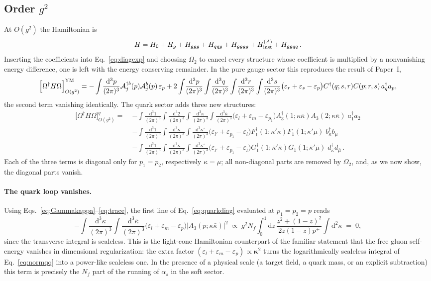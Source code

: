 \documentclass[11pt]{article}
\newcommand{\eps}{\varepsilon}
\newcommand{\dd}{\mathrm{d}}
\newcommand{\ip}[1]{\int\!\frac{\dd^3 #1}{(2\pi)^3}}
\newcommand{\dg}{\dagger}
\newcommand{\OM}{\Omega}
\newcommand{\Hqqg}{H_{q\bar q g}}
\newcommand{\Hggqq}{H_{ggq\bar q}}
\newcommand{\Hg}{H_{g}}
\newcommand{\Hggg}{H_{ggg}}
\newcommand{\Hgggg}{H_{gggg}}
\begin{document}
\subsection{Order $g^2$}
At $O(g^2)$ the Hamiltonian is
\begin{equation}
H=H_0+\Hg+\Hggg+\Hqqg+\Hgggg+H^{(A)}_{\rm inst}+\Hggqq\,.
\end{equation}
Inserting the coefficients into Eq.~\eqref{eq:diagexp} and choosing $\OM_2$ to cancel every
structure whose coefficient is multiplied by a nonvanishing energy difference, one is left with the
energy conserving remainder. In the pure gauge sector this reproduces the result of Paper~I,
\begin{equation}
\Big[\OM^\dg H\OM\Big]^{\rm YM}_{O(g^2)}
=-\ip{p}\mathcal A^{\dg b}_j(p)\mathcal A^b_j(p)\,\eps_p
+2\ip{p}\ip{q}\ip{r}\ip{s}\big(\eps_r+\eps_s-\eps_p\big)C^\dg(q;s,r)C(p;r,s)\,a^{\dg}_q a_p,
\end{equation}
the second term vanishing identically. The quark sector adds three new structures:
\begin{align}
\Big[\OM^\dg H\OM\Big]^{q}_{O(g^2)}
=\;&-\ip{1}\ip{2}\ip{\kappa}\ip{\bar\kappa}\big(\eps_l+\eps_m-\eps_{p_1}\big)
A^\dg_3(1;\kappa\bar\kappa)A_3(2;\kappa\bar\kappa)\;a^\dg_1a_2
\nonumber\\
&-\ip{1}\ip{\kappa}\ip{\kappa'}\big(\eps_{l'}+\eps_{p_1}-\eps_l\big)
F^\dg_1(1;\kappa'\kappa)F_1(1;\kappa'\mu)\;b^\dg_\kappa b_\mu
\nonumber\\
&-\ip{1}\ip{\bar\kappa}\ip{\bar\kappa'}\big(\eps_{\bar l'}+\eps_{p_1}-\eps_{\bar l}\big)
G^\dg_1(1;\bar\kappa'\bar\kappa)G_1(1;\bar\kappa'\bar\mu)\;d^\dg_{\bar\kappa}d_{\bar\mu}\,.
\label{eq:quarkdiag}
\end{align}
Each of the three terms is diagonal only for $p_1=p_2$, respectively $\kappa=\mu$; all
non-diagonal parts are removed by $\OM_2$, and, as we now show, the diagonal parts vanish.

\paragraph{The quark loop vanishes.} Using Eqs.~\eqref{eq:Gammakappa}--\eqref{eq:trace}, the first
line of Eq.~\eqref{eq:quarkdiag} evaluated at $p_1=p_2=p$ reads
\begin{equation}
-\ip{\kappa}\ip{\bar\kappa}\big(\eps_l+\eps_m-\eps_p\big)\big|A_3(p;\kappa\bar\kappa)\big|^2
\;\propto\;g^2N_f\int_0^1\!\dd z\,\frac{z^2+(1-z)^2}{2z(1-z)p^+}\int\!\dd^2\kappa\;=\;0,
\end{equation}
since the transverse integral is scaleless. This is the light-cone Hamiltonian counterpart of the
familiar statement that the free gluon self-energy vanishes in dimensional regularization: the
extra factor $(\eps_l+\eps_m-\eps_p)\propto\bm\kappa^2$ turns the logarithmically scaleless
integral of Eq.~\eqref{eq:normqq} into a power-like scaleless one. In the presence of a physical
scale (a target field, a quark mass, or an explicit subtraction) this term is precisely the $N_f$
part of the running of $\alpha_s$ in the soft sector.
\end{document}
